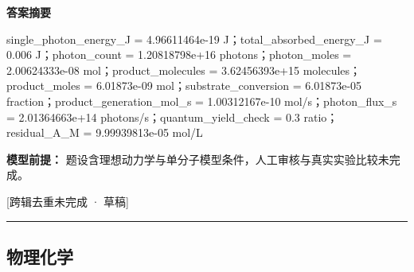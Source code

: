 \documentclass[UTF8,11pt,a4paper]{ctexart}
\begin{document}
\noindent\textbf{答案摘要}\par
single\_photon\_energy\_J = 4.96611464e-19 J；total\_absorbed\_energy\_J = 0.006 J；photon\_count = 1.20818798e+16 photons；photon\_moles = 2.00624333e-08 mol；product\_molecules = 3.62456393e+15 molecules；product\_moles = 6.01873e-09 mol；substrate\_conversion = 6.01873e-05 fraction；product\_generation\_mol\_s = 1.00312167e-10 mol/s；photon\_flux\_s = 2.01364663e+14 photons/s；quantum\_yield\_check = 0.3 ratio；residual\_A\_M = 9.99939813e-05 mol/L\par
\noindent\textbf{模型前提：}
题设含理想动力学与单分子模型条件，人工审核与真实实验比较未完成。\par
\noindent\textcolor{red!65!black}{[跨辑去重未完成 · 草稿]} \par
\medskip\hrule\medskip
\subsection*{物理化学}
\end{document}
